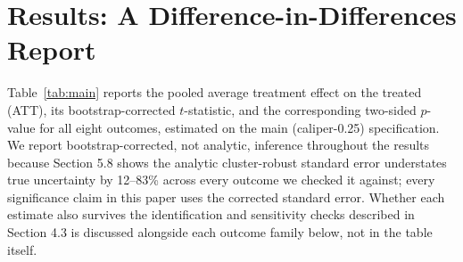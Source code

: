 \documentclass[12pt]{article}
\begin{document}
\section{Results: A Difference-in-Differences Report}

Table~\ref{tab:main} reports the pooled average treatment effect on the
treated (ATT), its bootstrap-corrected $t$-statistic, and the
corresponding two-sided $p$-value for all eight outcomes, estimated on
the main (caliper-0.25) specification. We report bootstrap-corrected,
not analytic, inference throughout the results because Section 5.8 shows
the analytic cluster-robust standard error understates true uncertainty
by 12--83\% across every outcome we checked it against; every
significance claim in this paper uses the corrected standard error.
Whether each estimate also survives the identification and sensitivity
checks described in Section 4.3 is discussed alongside each outcome
family below, not in the table itself.
\end{document}
